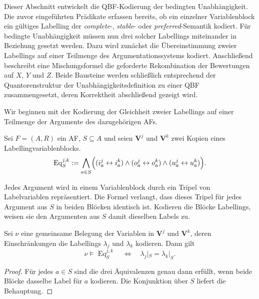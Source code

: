 Dieser Abschnitt entwickelt die QBF-Kodierung der bedingten Unabhängigkeit. Die zuvor eingeführten Prädikate erfassen bereits, 
ob ein einzelner Variablenblock ein gültiges Labelling der \emph{complete}-, \emph{stable}- oder \emph{preferred}-Semantik kodiert. 
Für bedingte Unabhängigkeit müssen nun drei solcher Labellings miteinander in Beziehung gesetzt werden. 
Dazu wird zunächst die Übereinstimmung zweier Labellings auf einer Teilmenge des Argumentationssystems kodiert. 
Anschließend beschreibt eine Mischungsformel die geforderte Rekombination der Bewertungen auf \(X\), \(Y\) und \(Z\). 
Beide Bausteine werden schließlich entsprechend der Quantorenstruktur der Unabhängigkeitsdefinition zu einer QBF zusammengesetzt, 
deren Korrektheit abschließend gezeigt wird.


Wir beginnen mit der Kodierung der Gleichheit zweier Labellings auf einer Teilmenge der Argumente des dazugehörigen AFs.
\begin{Definition}
    \label{def:equality-formula}
    Sei \(F =(A,R)\) ein AF, \(S\subseteq A\) und seien \(\mathbf V^j\) und \(\mathbf V^k\) zwei Kopien eines
    Labellingvariablenblocks.
    \[
        \operatorname{Eq}^{j,k}_S
        :=
        \bigwedge_{a\in S}
        \Bigl(
            (i_a^j\leftrightarrow i_a^k)
            \land(o_a^j\leftrightarrow o_a^k)
            \land(u_a^j\leftrightarrow u_a^k)
        \Bigr).
    \]
\end{Definition}
Jedes Argument wird in einem Variablenblock durch ein Tripel von Labelvariablen repräsentiert. Die Formel verlangt, 
dass dieses Tripel für jedes Argument aus \(S\) in beiden Blöcken identisch ist.
Kodieren die Blöcke Labellings, weisen sie den Argumenten aus \(S\) damit dieselben Labels zu.
\begin{Lemma}
    \label{lem:equality-correct}
    Sei \(\nu\) eine gemeinsame Belegung der Variablen in
    \(\mathbf V^j\) und \(\mathbf V^k\), deren Einschränkungen die
    Labellings \(\lambda_j\) und \(\lambda_k\) kodieren. Dann gilt
    \[
        \nu\models\operatorname{Eq}^{j,k}_S
        \quad\Longleftrightarrow\quad
        \lambda_j|_S=\lambda_k|_S.
    \]
\end{Lemma}
\begin{proof}
    Für jedes \(a\in S\) sind die drei Äquivalenzen genau dann erfüllt,
    wenn beide Blöcke dasselbe Label für \(a\) kodieren. Die Konjunktion
    über \(S\) liefert die Behauptung.
\end{proof}


